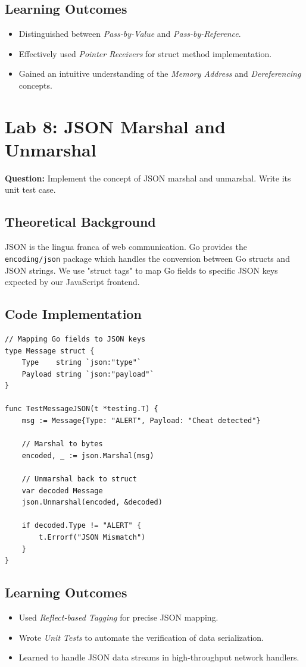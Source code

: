 \documentclass[12pt,a4paper]{article}
\begin{document}
\subsection{Learning Outcomes}
\begin{itemize}
    \item Distinguished between \textit{Pass-by-Value} and \textit{Pass-by-Reference}.
    \item Effectively used \textit{Pointer Receivers} for struct method implementation.
    \item Gained an intuitive understanding of the \textit{Memory Address} and \textit{Dereferencing} concepts.
\end{itemize}

\newpage
\section{Lab 8: JSON Marshal and Unmarshal}
\textbf{Question:} Implement the concept of JSON marshal and unmarshal. Write its unit test case.

\subsection{Theoretical Background}
JSON is the lingua franca of web communication. Go provides the \texttt{encoding/json} package which handles the conversion between Go structs and JSON strings. We use "struct tags" to map Go fields to specific JSON keys expected by our JavaScript frontend.

\subsection{Code Implementation}
\begin{lstlisting}
// Mapping Go fields to JSON keys
type Message struct {
	Type    string `json:"type"`
	Payload string `json:"payload"`
}

func TestMessageJSON(t *testing.T) {
    msg := Message{Type: "ALERT", Payload: "Cheat detected"}
    
    // Marshal to bytes
    encoded, _ := json.Marshal(msg)
    
    // Unmarshal back to struct
    var decoded Message
    json.Unmarshal(encoded, &decoded)
    
    if decoded.Type != "ALERT" {
        t.Errorf("JSON Mismatch")
    }
}
\end{lstlisting}

\subsection{Learning Outcomes}
\begin{itemize}
    \item Used \textit{Reflect-based Tagging} for precise JSON mapping.
    \item Wrote \textit{Unit Tests} to automate the verification of data serialization.
    \item Learned to handle JSON data streams in high-throughput network handlers.
\end{itemize}
\end{document}
